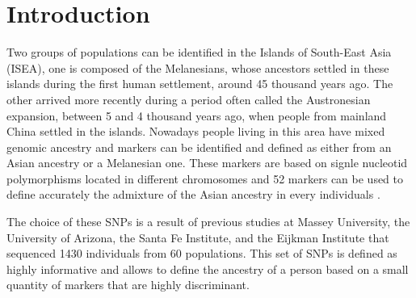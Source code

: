 \documentclass[a4paper,12pt]{report}
\begin{document}

\tableofcontents

\chapter*{Introduction}
Two groups of populations can be identified in the Islands of South-East Asia (ISEA), one is composed of the Melanesians, whose ancestors settled in these islands during the first human settlement, around 45 thousand years ago. The other arrived more recently during a period often called the Austronesian expansion, between 5 and 4 thousand years ago, when people from mainland China settled in the islands. Nowadays people living in this area have mixed genomic ancestry and markers can be identified and defined as either from an Asian ancestry or a Melanesian one. These markers are based on signle nucleotid polymorphisms located in different chromosomes and 52 markers can be used to define accurately the admixture of the Asian ancestry in every individuals \cite{Cox01}.

The choice of these SNPs is a result of previous studies at Massey University, the University of Arizona, the Santa Fe Institute, and the Eijkman Institute that sequenced 1430 individuals from 60 populations. This set of SNPs is defined as highly informative and allows to define the ancestry of a person based on a small quantity of markers that are highly discriminant.
\end{document}
